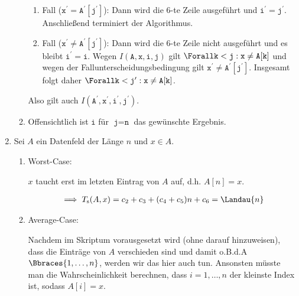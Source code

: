 \begin{solution}
\begin{enumerate}[label = (\alph*)]
\begin{enumerate}[label = \arabic*.]
    \begin{enumerate}[label = \Roman*.]
      
      \item Fall ($\texttt{x}^\prime = \texttt{A}^\prime[\texttt{j}^\prime]$):
      Dann wird die $6$-te Zeile ausgeführt und $\texttt{i}^\prime = \texttt{j}^\prime$.
      Anschließend terminiert der Algorithmus.

      \item Fall ($\texttt{x}^\prime \neq \texttt{A}^\prime[\texttt{j}^\prime]$):
      Dann wird die $6$-te Zeile nicht ausgeführt und es bleibt $\texttt{i}^\prime = \texttt{i}$.
      Wegen $I(\texttt{A}, \texttt{x}, \texttt{i}, \texttt{j})$ gilt $\Forall \texttt{k} < \texttt{j}: \texttt{x} \neq \texttt{A}[\texttt{k}]$ und wegen der Fallunterscheidungsbedingung gilt $\texttt{x}^\prime \neq \texttt{A}^\prime[\texttt{j}^\prime]$.
      Insgesamt folgt daher $\Forall \texttt{k} < \texttt{j}^\prime: \texttt{x} \neq \texttt{A}[\texttt{k}]$.
    \end{enumerate}

    Also gilt auch $I(\texttt{A}^\prime, \texttt{x}^\prime, \texttt{i}^\prime, \texttt{j}^\prime)$.

    \item Offensichtlich ist $\texttt{i}$ für $\texttt{j} = \texttt{n}$ das gewünschte Ergebnis.

  \end{enumerate}

  \item Sei $A$ ein Datenfeld der Länge $n$ und $x \in A$.

  \begin{enumerate}[label = \arabic*.]

    \item Worst-Case:

    $x$ taucht erst im letzten Eintrag von $A$ auf, d.h. $A[n] = x$.

    \begin{align*}
      \implies
      T_{\mathrm{s}}(A, x)
      =
      c_2 + c_3 + (c_4 + c_5) n + c_6
      =
      \Landau{n}
    \end{align*}
  
    \item Average-Case:

    Nachdem im Skriptum vorausgesetzt wird (ohne darauf hinzuweisen), dass die Einträge von $A$ verschieden sind und damit o.B.d.A $\Bbraces{1, \dots, n}$, werden wir das hier auch tun.
    Ansonsten müsste man die Wahrscheinlichkeit berechnen, dass $i = 1, \dots, n$ der kleinste Index ist, sodass $A[i] = x$.


\end{enumerate}
\end{enumerate}
\end{solution}
